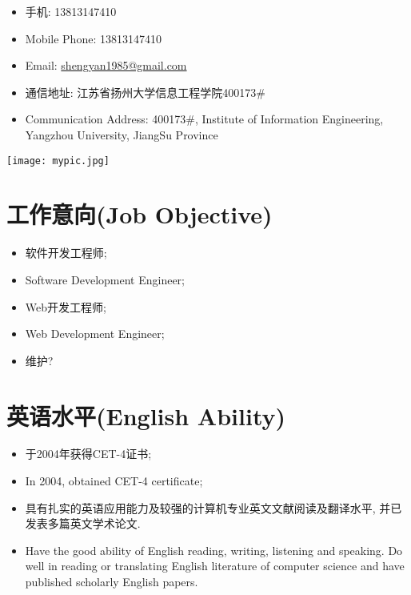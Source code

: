 \documentclass[letterpaper,10pt,english]{manual}
\begin{document}
\begin{itemize}
\item {} 
手机: 13813147410

\item {} 
Mobile Phone: 13813147410

\item {} 
Email: \href{mailto:shengyan1985@gmail.com}{shengyan1985@gmail.com}

\item {} 
通信地址: 江苏省扬州大学信息工程学院400173\#

\item {} 
Communication Address: 400173\#, Institute of Information Engineering, Yangzhou University, JiangSu Province

\end{itemize}

\texttt{[image: mypic.jpg]}


\section{工作意向(Job Objective)}
\begin{itemize}
\item {} 
软件开发工程师;

\item {} 
Software Development Engineer;

\item {} 
Web开发工程师;

\item {} 
Web Development Engineer;

\item {} 
维护?

\end{itemize}


\section{英语水平(English Ability)}
\begin{itemize}
\item {} 
于2004年获得CET-4证书;

\item {} 
In 2004, obtained CET-4 certificate;

\item {} 
具有扎实的英语应用能力及较强的计算机专业英文文献阅读及翻译水平, 并已发表多篇英文学术论文.

\item {} 
Have the good ability of English reading, writing, listening and speaking. Do well in reading or translating English literature of computer science and have published scholarly English papers.

\end{itemize}
\end{document}
